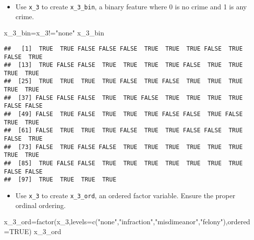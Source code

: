 \documentclass[
]{article}
\newenvironment{Shaded}{\begin{snugshade}}{\end{snugshade}}
\newcommand{\AttributeTok}[1]{\textcolor[rgb]{0.77,0.63,0.00}{#1}}
\newcommand{\ConstantTok}[1]{\textcolor[rgb]{0.00,0.00,0.00}{#1}}
\newcommand{\FunctionTok}[1]{\textcolor[rgb]{0.00,0.00,0.00}{#1}}
\newcommand{\NormalTok}[1]{#1}
\newcommand{\OtherTok}[1]{\textcolor[rgb]{0.56,0.35,0.01}{#1}}
\newcommand{\SpecialCharTok}[1]{\textcolor[rgb]{0.00,0.00,0.00}{#1}}
\newcommand{\StringTok}[1]{\textcolor[rgb]{0.31,0.60,0.02}{#1}}
\providecommand{\tightlist}{%
  \setlength{\itemsep}{0pt}\setlength{\parskip}{0pt}}
\begin{document}
\begin{itemize}
\tightlist
\item
  Use \texttt{x\_3} to create \texttt{x\_3\_bin}, a binary feature where
  0 is no crime and 1 is any crime.
\end{itemize}

\begin{Shaded}
\begin{Highlighting}[]
\NormalTok{x\_3\_bin}\OtherTok{=}\NormalTok{x\_3}\SpecialCharTok{!=}\StringTok{"none"}
\NormalTok{x\_3\_bin}
\end{Highlighting}
\end{Shaded}

\begin{verbatim}
##   [1]  TRUE  TRUE FALSE FALSE FALSE  TRUE  TRUE  TRUE FALSE  TRUE FALSE  TRUE
##  [13]  TRUE FALSE FALSE  TRUE  TRUE  TRUE  TRUE FALSE  TRUE  TRUE  TRUE  TRUE
##  [25]  TRUE  TRUE  TRUE  TRUE FALSE  TRUE FALSE  TRUE  TRUE  TRUE  TRUE  TRUE
##  [37] FALSE FALSE FALSE  TRUE  TRUE FALSE  TRUE  TRUE  TRUE  TRUE FALSE FALSE
##  [49] FALSE  TRUE FALSE  TRUE  TRUE  TRUE FALSE FALSE  TRUE FALSE  TRUE  TRUE
##  [61] FALSE  TRUE  TRUE  TRUE FALSE  TRUE  TRUE FALSE FALSE  TRUE FALSE  TRUE
##  [73] FALSE  TRUE FALSE FALSE  TRUE  TRUE  TRUE  TRUE  TRUE  TRUE  TRUE  TRUE
##  [85]  TRUE FALSE FALSE  TRUE  TRUE  TRUE  TRUE  TRUE  TRUE  TRUE FALSE FALSE
##  [97]  TRUE  TRUE  TRUE  TRUE
\end{verbatim}

\begin{itemize}
\tightlist
\item
  Use \texttt{x\_3} to create \texttt{x\_3\_ord}, an ordered factor
  variable. Ensure the proper ordinal ordering.
\end{itemize}

\begin{Shaded}
\begin{Highlighting}[]
\NormalTok{x\_3\_ord}\OtherTok{=}\FunctionTok{factor}\NormalTok{(x\_3,}\AttributeTok{levels=}\FunctionTok{c}\NormalTok{(}\StringTok{"none"}\NormalTok{,}\StringTok{"infraction"}\NormalTok{,}\StringTok{"misdimeanor"}\NormalTok{,}\StringTok{"felony"}\NormalTok{),}\AttributeTok{ordered=}\ConstantTok{TRUE}\NormalTok{)}
\NormalTok{x\_3\_ord}
\end{Highlighting}
\end{Shaded}
\end{document}
